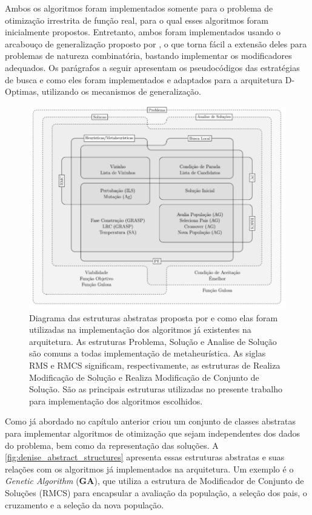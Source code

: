 Ambos os algoritmos foram implementados somente para o problema de otimização irrestrita de função real, para o qual esses algoritmos foram inicialmente propostos. Entretanto, ambos foram implementados usando o arcabouço de generalização proposto por , o que torna fácil a extensão deles para problemas de natureza combinatória, bastando implementar os modificadores adequados. Os parágrafos a seguir apresentam os pseudocódigos das estratégias de busca e como eles foram implementados e adaptados para a arquitetura D-Optimas, utilizando os mecanismos de generalização. 

\begin{figure}[ht!]
    \centering
    \caption{Diagrama das estruturas abstratas proposta por  e como elas foram  utilizadas na implementação dos algoritmos já existentes na arquitetura. As estruturas Problema, Solução e Analise de Solução são comuns a todas implementação de metaheurística. As siglas RMS e RMCS significam, respectivamente, as estruturas de Realiza Modificação de Solução e Realiza Modificação de Conjunto de Solução. São as principais estruturas utilizadas no presente trabalho para implementação dos algoritmos escolhidos. }
    \label{fig:denise_abstract_structures}
    \includegraphics[scale=0.5]{imagens/denise-abstract-structures.png}
\end{figure}

Como já abordado no capítulo anterior  criou um conjunto de classes abstratas para implementar algoritmos de otimização que sejam independentes dos dados do problema, bem como da representação das soluções. A \autoref{fig:denise_abstract_structures} apresenta essas estruturas abstratas e suas relações com os algoritmos já implementados na arquitetura. Um exemplo é o \textit{Genetic Algorithm} (\textbf{GA}), que utiliza a estrutura de Modificador de Conjunto de Soluções (RMCS) para encapsular a avaliação da população, a seleção dos pais, o cruzamento e a seleção da nova população. 

